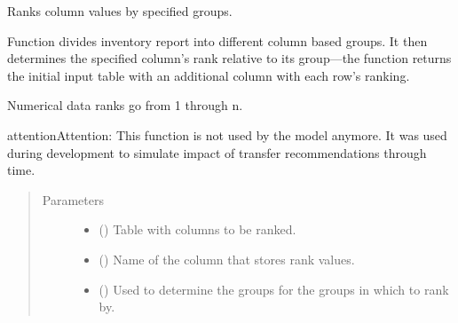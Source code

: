 \documentclass[letterpaper,10pt,english]{sphinxmanual}
\begin{document}
\begin{fulllineitems}
\label{\detokenize{source/optimization.datatools:optimization.datatools.dataprep.rank_column}}
Ranks column values by specified groups.

Function divides inventory report into different column based groups.
It then determines the specified column’s rank relative to its
group—the function returns the initial input table with an additional
column with each row’s ranking.

Numerical data ranks go from 1 through n.

\begin{sphinxadmonition}{attention}{Attention:}
This function is not used by the model anymore. It was used during development to simulate
impact of transfer recommendations through time.
\end{sphinxadmonition}
\begin{quote}\begin{description}
\item[{Parameters}] \leavevmode\begin{itemize}
\item {} 
 () \textendash{} Table with columns to be ranked.

\item {} 
 () \textendash{} Name of the column that stores rank values.

\item {} 
 (\sphinxstyleliteralemphasis{\sphinxupquote{{[}}}\sphinxstyleliteralemphasis{\sphinxupquote{, }}\sphinxstyleliteralemphasis{\sphinxupquote{{]}}}) \textendash{} Used to determine the groups for the groups in which to rank by.


\end{itemize}
\end{description}
\end{quote}
\end{fulllineitems}
\end{document}
